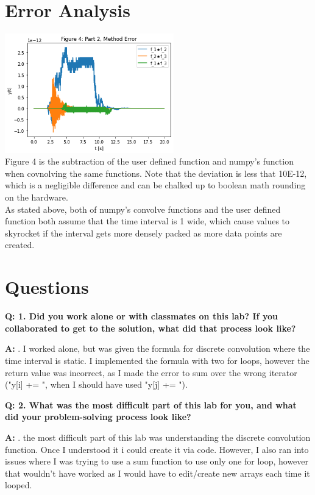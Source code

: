 \documentclass[12pt,a4paper]{article}
\newcommand{\Q}{\bigskip\bfseries Q: }
\newcommand{\A}{\par\textbf{A:} \normalfont}
\begin{document}
\section{Error Analysis}\label{sec:res}
\includegraphics[width=0.55\textwidth]{Figure4.png}\\
Figure 4 is the subtraction of the user defined function and numpy's function when covnolving the same functions. Note that the deviation is less that 10E-12, which is a negligible difference and can be chalked up to boolean math rounding on the hardware.\\

As stated above, both of numpy's convolve functions and the user defined function both assume that the time interval is 1 wide, which cause values to skyrocket if the interval gets more densely packed as more data points are created.

\section{Questions}\label{sec:res}

\Q 1. Did you work alone or with classmates on this lab? If you collaborated to get to the solution, what did that process look like?
\A 1. I worked alone, but was given the formula for discrete convolution where the time interval is static. I implemented the formula with two for loops, however the return value was incorrect, as I made the error to sum over the wrong iterator ("y[i] += ", when I should have used "y[j] += ").

\Q 2. What was the most difficult part of this lab for you, and what did your problem-solving process look like?
\A 2.  the most difficult part of this lab was understanding the discrete convolution function.  Once I understood it i could create it via code. However, I also ran into issues where I was trying to use a sum function to use only one for loop, however that wouldn't have worked as I would have to edit/create new arrays each time it looped.
\end{document}
